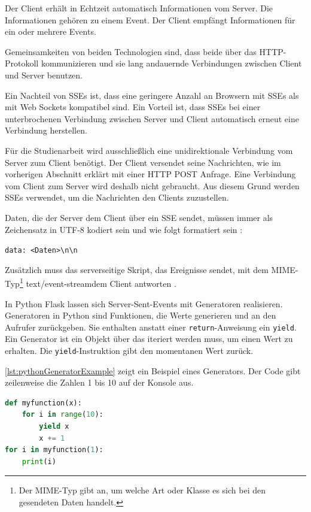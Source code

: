 \documentclass[a4paper,titlepage,halfparskip,12pt]{scrreprt}
\newcommand*{\escape}[1]{\texttt{\textbackslash#1}}
\begin{document}
\begin{onehalfspacing}
Der Client erhält in Echtzeit automatisch Informationen vom Server. Die Informationen gehören zu einem Event. Der Client empfängt Informationen für ein oder mehrere Events.\cite{sseMorzilla, sseVSwebsockets}

Gemeinsamkeiten von beiden Technologien sind, dass beide über das \acs{HTTP}-Protokoll kommunizieren und sie lang andauernde Verbindungen zwischen Client und Server benutzen.

Ein Nachteil von \acs{SSE}s ist, dass eine geringere Anzahl an Browsern mit \acs{SSE}s als mit Web Sockets kompatibel sind. Ein Vorteil ist, dass \acs{SSE}s bei einer unterbrochenen Verbindung zwischen Server und Client automatisch erneut eine Verbindung herstellen.\cite{sseMorzilla}

Für die Studienarbeit wird ausschließlich eine unidirektionale Verbindung vom Server zum Client benötigt. Der Client versendet seine Nachrichten, wie im vorherigen Abschnitt erklärt mit einer \acs{HTTP} POST Anfrage. Eine Verbindung vom Client zum Server wird deshalb nicht gebraucht. Aus diesem Grund werden \acs{SSE}s verwendet, um die Nachrichten den Clients zuzustellen.

Daten, die der Server dem Client über ein \acs{SSE} sendet, müssen immer als Zeichensatz in UTF-8 kodiert sein und wie folgt formatiert sein \cite{sseMorzilla}:

\texttt{data: <Daten>\escape{n}\escape{n}}

Zusätzlich muss das serverseitige Skript, das Ereignisse sendet, mit dem \acs{MIME}-Typ\footnote{ Der MIME-Typ gibt an, um welche Art oder Klasse es sich bei den gesendeten Daten handelt.\cite{mimeTypDescription}} \glqq text/event-stream\grqq dem Client antworten \cite{sseMorzilla}.

In Python Flask lassen sich Server-Sent-Events mit Generatoren realisieren. Generatoren in Python sind Funktionen, die Werte generieren und an den Aufrufer zurückgeben. Sie enthalten anstatt einer \texttt{return}-Anweisung ein \texttt{yield}. Ein Generator ist ein Objekt über das iteriert werden muss, um einen Wert zu erhalten. Die \texttt{yield}-Instruktion gibt den momentanen Wert zurück.

\autoref{lst:pythonGeneratorExample} zeigt ein Beispiel eines Generators. Der Code gibt zeilenweise die Zahlen 1 bis 10 auf der Konsole aus.

\begin{lstlisting}[language=python, caption={Beispiel: Code für ein Generator Objekt in Python}, label={lst:pythonGeneratorExample}]
def myfunction(x):
    for i in range(10):
        yield x
        x += 1
for i in myfunction(1):
    print(i)
\end{lstlisting}


\end{onehalfspacing}
\end{document}

